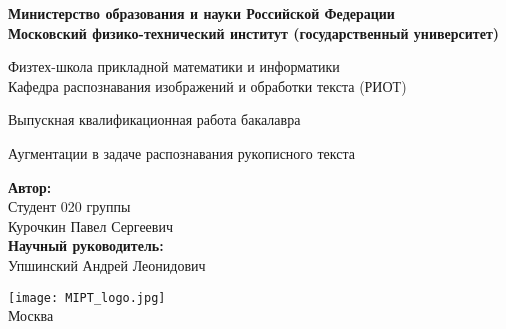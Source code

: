 \begin{center}
    \large\textbf{Министерство образования и науки Российской Федерации \\
    Московский физико-технический институт (государственный
    университет)} \\
    \vspace{1cm}

    Физтех-школа прикладной математики и информатики \\

    Кафедра распознавания изображений и обработки текста (РИОТ)\\

    \vspace{3em}

    Выпускная квалификационная работа бакалавра
\end{center}

\begin{center}
    \vspace{\fill}
    \LARGE{Аугментации в задаче распознавания рукописного текста}

    \vspace{\fill}
\end{center}


\begin{flushright}
    \textbf{Автор:} \\
    Студент 020 группы \\
    Курочкин Павел Сергеевич \\
    \vspace{2em}
    \textbf{Научный руководитель:} \\
    Упшинский Андрей Леонидович \\
    \vspace{2em}
\end{flushright}

\vspace{7em}

\begin{center}
    \texttt{[image: MIPT\_logo.jpg]}\\
    Москва \the\year{}
\end{center}

\thispagestyle{empty}

\newpage
\setcounter{page}{2}
\fancyfoot[c]{\thepage}
\fancyhead[R]{}